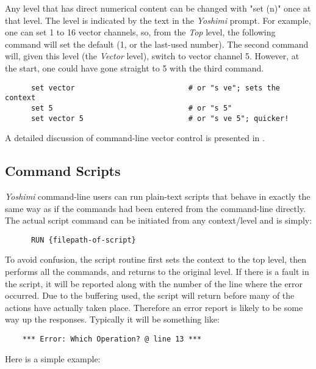    Any level that has direct numerical content can be changed with
   "set (n)" once at that level.  The level is
   indicated by the text in the \textsl{Yoshimi} prompt.
   For example, one can set 1 to 16 vector channels, so, from the
   \textsl{Top} level, the following command
   will set the default (1, or the last-used number).
   The second command will, given this level (the \textsl{Vector} level),
   switch to vector channel 5.
   However, at the start, one could have gone straight to 5 with the third
   command.

   \begin{verbatim}
      set vector                          # or "s ve"; sets the context
      set 5                               # or "s 5"
      set vector 5                        # or "s ve 5"; quicker!
   \end{verbatim}

   A detailed discussion of command-line vector control is presented in
   .

\subsection{Command Scripts}
\label{subsec:command_line_command_scripts}

   \textsl{Yoshimi} command-line users can run plain-text scripts that behave
   in exactly the same way as if the commands had been entered from the
   command-line directly.
   The actual script command can be initiated from any context/level
   and is simply:

   \begin{verbatim}
      RUN {filepath-of-script}
   \end{verbatim}

   To avoid confusion, the script routine first sets the context to the
   top level, then performs all the commands, and returns to the original
   level. If there is a fault in the script, it will be reported along with the
   number of the line where the error occurred. Due to the buffering used, the script will return before many of the actions have actually taken place. Therefore an error report is likely to be some way up the responses. Typically it will be something like:

   \begin{verbatim}
    *** Error: Which Operation? @ line 13 ***
   \end{verbatim}

   Here is a simple example:

